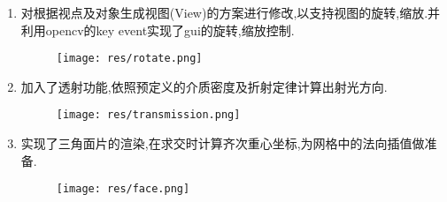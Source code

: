 \begin{enumerate}
\item 对根据视点及对象生成视图(View)的方案进行修改,以支持视图的旋转,缩放.并利用opencv的key event实现了gui的旋转,缩放控制.
\begin{figure}[H]
  \centering
  \texttt{[image: res/rotate.png]}
  \caption{\label{fig:rotate}}
\end{figure}

\item 加入了透射功能,依照预定义的介质密度及折射定律计算出射光方向.
\begin{figure}[H]
  \centering
  \texttt{[image: res/transmission.png]}
  \caption{\label{fig:transmission}}
\end{figure}

\item 实现了三角面片的渲染,在求交时计算齐次重心坐标,为网格中的法向插值做准备.
\begin{figure}[H]
  \centering
  \texttt{[image: res/face.png]}
  \caption{\label{fig:face}}
\end{figure}


\end{enumerate}
